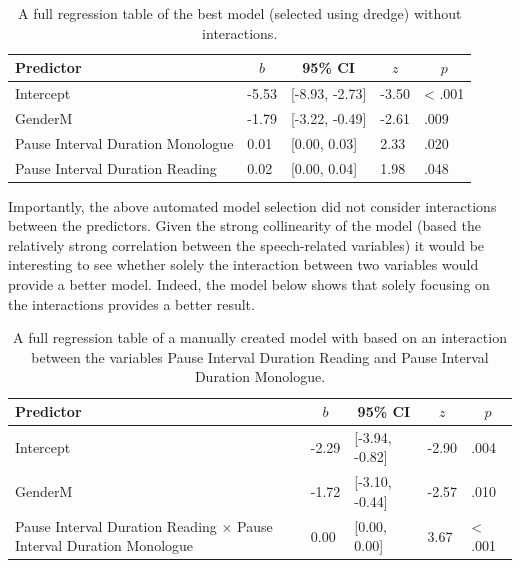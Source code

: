 \documentclass[
  english,
  doc,floatsintext]{apa6}
\begin{document}
\begin{table}[tbp]

\begin{center}
\begin{threeparttable}

\caption{\label{tab:table-best-model-dredge}A full regression table of the best model (selected using dredge) without interactions.}

\begin{tabular}{lllll}
\toprule
Predictor & \multicolumn{1}{c}{$b$} & \multicolumn{1}{c}{95\% CI} & \multicolumn{1}{c}{$z$} & \multicolumn{1}{c}{$p$}\\
\midrule
Intercept & -5.53 & {}[-8.93, -2.73] & -3.50 & < .001\\
GenderM & -1.79 & {}[-3.22, -0.49] & -2.61 & .009\\
Pause Interval Duration Monologue & 0.01 & {}[0.00, 0.03] & 2.33 & .020\\
Pause Interval Duration Reading & 0.02 & {}[0.00, 0.04] & 1.98 & .048\\
\bottomrule
\end{tabular}

\end{threeparttable}
\end{center}

\end{table}

Importantly, the above automated model selection did not consider interactions between the predictors.
Given the strong collinearity of the model (based the relatively strong correlation between the speech-related
variables) it would be interesting to see whether solely the interaction between two variables would provide
a better model. Indeed, the model below shows that solely focusing on the interactions provides a better result.

\begin{table}[tbp]

\begin{center}
\begin{threeparttable}

\caption{\label{tab:interaction-model}A full regression table of a manually created model with based on an interaction between the variables Pause Interval Duration Reading and Pause Interval Duration Monologue.}

\begin{tabular}{lllll}
\toprule
Predictor & \multicolumn{1}{c}{$b$} & \multicolumn{1}{c}{95\% CI} & \multicolumn{1}{c}{$z$} & \multicolumn{1}{c}{$p$}\\
\midrule
Intercept & -2.29 & {}[-3.94, -0.82] & -2.90 & .004\\
GenderM & -1.72 & {}[-3.10, -0.44] & -2.57 & .010\\
Pause Interval Duration Reading $\times$ Pause Interval Duration Monologue & 0.00 & {}[0.00, 0.00] & 3.67 & < .001\\
\bottomrule
\end{tabular}

\end{threeparttable}
\end{center}

\end{table}
\end{document}

